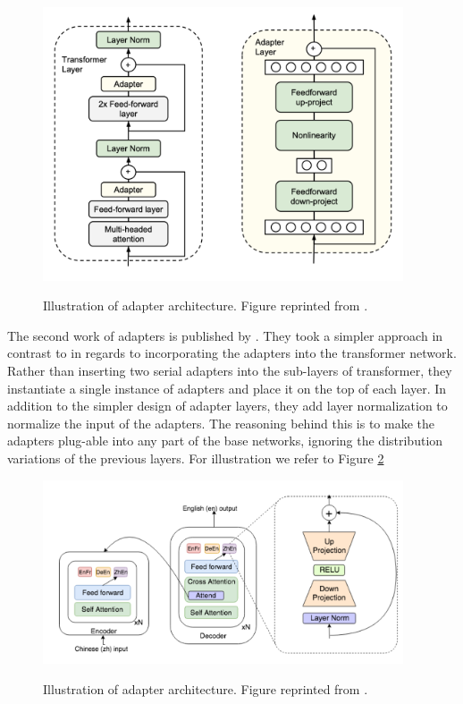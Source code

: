 \begin{figure}[h]
    {\includegraphics[width=0.95\textwidth]{img/adapter_houlsby.png}}
    \centering
    \caption{Illustration of adapter architecture. Figure reprinted from \cite{houlsby2019parameter}.}
    \label{img:ada_houlsby}
\end{figure}

The second work of adapters is published by \cite{bapna2019simple}. They took a simpler approach in contrast to \cite{houlsby2019parameter} in regards to incorporating the adapters into the transformer network. Rather than inserting two serial adapters into the sub-layers of transformer, they instantiate a single instance of adapters and place it on the top of each layer. In addition to the simpler design of adapter layers, they add layer normalization to normalize the input of the adapters. The reasoning behind this is to make the adapters plug-able into any part of the base networks, ignoring the distribution variations of the previous layers. For illustration we refer to Figure \ref{img:ada_bapna}

\begin{figure}[h]
    {\includegraphics[width=0.95\textwidth]{img/adapter_bapna.png}}
    \centering
    \caption{Illustration of adapter architecture. Figure reprinted from \cite{bapna2019simple}.}
    \label{img:ada_bapna}
\end{figure}

